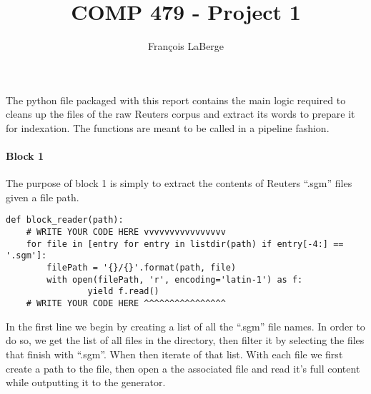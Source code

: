 \documentclass[]{report}
\title{COMP 479 - Project 1}
\author{François LaBerge}
\begin{document}
\maketitle

The python file packaged with this report contains the main logic required to cleans up the files of the raw Reuters corpus and extract its words to prepare it for indexation. The functions are meant to be called in a pipeline fashion.

\paragraph{Block 1}
The purpose of block 1 is simply to extract the contents of Reuters ``.sgm'' files given a file path.
\begin{verbatim}
def block_reader(path):
	# WRITE YOUR CODE HERE vvvvvvvvvvvvvvvv
	for file in [entry for entry in listdir(path) if entry[-4:] == '.sgm']:
		filePath = '{}/{}'.format(path, file)
		with open(filePath, 'r', encoding='latin-1') as f:
				yield f.read()
	# WRITE YOUR CODE HERE ^^^^^^^^^^^^^^^^
\end{verbatim}
In the first line we begin by creating a list of all the ``.sgm'' file names. In order to do so, we get the list of all files in the directory, then filter it by selecting the files that finish with ``.sgm''. When then iterate of that list. With each file we first create a path to the file, then open a the associated file and read it's full content while outputting it to the generator.
\end{document}
